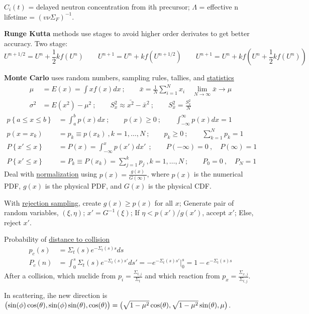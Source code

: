 \documentclass[12pt]{article}
\begin{document}
 \vspace*{-1.5em}
$C_i(t)$ = delayed neutron concentration from ith precursor; $\Lambda$ = effective n lifetime = $(v\nu\Sigma_F)^{-1}$.

\textbf{Runge Kutta} methods use stages to avoid higher order derivates to get better accuracy. Two stage:
\vspace*{-.5em}
\[U^{n+1/2} = U^n + \frac{1}{2}kf(U^n)\qquad U^{n+1} = U^n + kf(U^{n+1/2}) \qquad U^{n+1} = U^n + kf(U^n + \frac{1}{2}kf(U^n))\]

\textbf{Monte Carlo} uses random numbers, sampling rules, tallies, and \underline{statistics}
\begin{align*}
\mu &= E(x) = \int x f(x) dx \:;  \qquad \bar{x} = \frac{1}{N}\sum_{i=1}^N x_i \quad \lim_{N \to \infty} \bar{x} \rightarrow \mu \\
%
\sigma^2 &= E(x^2) - \mu^2 \:; \qquad S_x^2 \approx \bar{x^2} - \bar{x}^2\:; \qquad S_{\bar{x}}^2 = \frac{S_x^2}{N}
\end{align*}
%
\begin{align*}
    p\left\lbrace a \leq x \leq b \right\rbrace &= \int_a^b p(x)dx\:; \qquad    p(x)  \geq 0 \:; \qquad    \int_{-\infty}^{\infty} p(x)dx = 1\\
    p(x = x_k) &= p_k \equiv p(x_k)\:,  k = 1, \dots, N \:; \qquad  p_k  \geq 0\:; \qquad \sum_{k=1}^N p_k = 1\\
    P\left\lbrace x' \leq x \right\rbrace &= P(x) = \int_{-\infty}^x p(x')dx'\ \:; \qquad P(-\infty) = 0 \:,\quad P(\infty) = 1\\
    P\left\lbrace x' \leq x \right\rbrace &= P_k \equiv P(x_k) = \sum_{j=1}^k p_j\:, k = 1, \dots, N \:; \qquad P_0 = 0 \:,\quad P_N = 1
\end{align*}
Deal with \underline{normalization} using $p(x) = \frac{g(x)}{G(\infty)}$, where $p(x)$ is the numerical PDF, $g(x)$ is the physical PDF, and $G(x)$ is the physical CDF.

With \underline{rejection sampling}, create $g(x)\geq p(x)$ for all $x$; Generate pair of random variables, $(\xi, \eta)$; $x' = G^{-1} (\xi)$; If $\eta < p(x')/g(x')$, accept $x'$;  Else, reject $x'$.

Probability of \underline{distance to collision}
    \begin{align*}
    p_c(s) &= \Sigma_t(s) e^{-\Sigma_t(s) s} ds \\
    P_c(n) &= \int_0^s \Sigma_t(s) e^{-\Sigma_t(s) s'}ds' = -e^{-\Sigma_t(s) s'} |_0^s = 1 - e^{-\Sigma_t(s) s}
  \end{align*}
After a collision, which nuclide from $p_i = \frac{\Sigma_{t,j}}{\Sigma_t}$ and which reaction from $p_x = \frac{\Sigma_{x,j}}{\Sigma_{t,j}}$.
  
In scattering, ihe new direction is $\bigl(\sin(\phi) \cos(\theta), \sin(\phi) \sin(\theta), \cos(\theta)\bigr) =\\ \bigl(\sqrt{1 - \mu^2} \cos(\theta),  \sqrt{1 - \mu^2} \sin(\theta), \mu \bigr)$.
\end{document}
